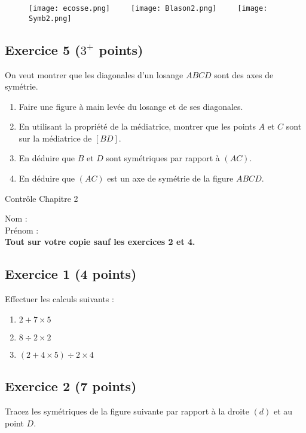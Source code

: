 \documentclass[14 pt]{extarticle}
\theoremstyle{plain}
\begin{document}
\begin{figure}[H]
\center 
\texttt{[image: ecosse.png]}\ \ \ \ \ 
\texttt{[image: Blason2.png]}\ \ \ \ \ 
\texttt{[image: Symb2.png]}
\end{figure}
 
 \subsection*{Exercice 5 ($3^+$ points)}
 
On veut montrer que les diagonales d'un losange $ABCD$ sont des axes de symétrie. 

\begin{enumerate}
\item Faire une figure à main levée du losange et de ses diagonales. 
\item En utilisant la propriété de la médiatrice, montrer que les points $A$ et $C$ sont sur la médiatrice de $[BD]$. 
\item En déduire que $B$ et $D$ sont symétriques par rapport à $(AC)$. 
\item En déduire que $(AC)$ est un axe de symétrie de la figure $ABCD$. 
\end{enumerate}


\newpage 

\begin{center}{\Large Contrôle Chapitre 2}\\ 
 \end{center}
 Nom : \\
 Prénom : \\
 
 \textbf{Tout sur votre copie sauf les exercices 2 et 4.}
 \subsection*{Exercice 1 (4 points)}
Effectuer les calculs suivants : 
\begin{enumerate}
\item $2+ 7 \times 5  $
\item $8\div 2 \times 2$ 
\item $ (2+ 4\times5) \div 2\times 4$
\end{enumerate}


 \subsection*{Exercice 2 (7 points)}
 
 Tracez les symétriques de la figure suivante par rapport à la droite $(d)$ et au point $D$. 
 
\end{document}
